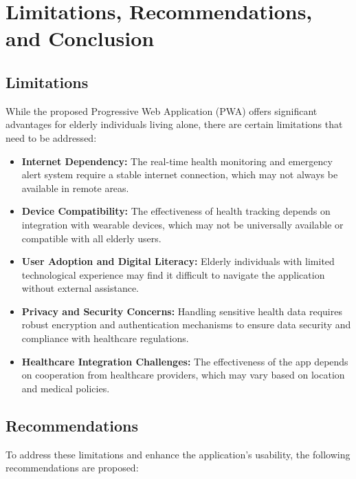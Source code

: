 \chapter{Limitations, Recommendations, and Conclusion}

\section{Limitations}
While the proposed Progressive Web Application (PWA) offers significant advantages for elderly individuals living alone, there are certain limitations that need to be addressed:

\begin{itemize}
    \item \textbf{Internet Dependency:} The real-time health monitoring and emergency alert system require a stable internet connection, which may not always be available in remote areas.
    \item \textbf{Device Compatibility:} The effectiveness of health tracking depends on integration with wearable devices, which may not be universally available or compatible with all elderly users.
    \item \textbf{User Adoption and Digital Literacy:} Elderly individuals with limited technological experience may find it difficult to navigate the application without external assistance.
    \item \textbf{Privacy and Security Concerns:} Handling sensitive health data requires robust encryption and authentication mechanisms to ensure data security and compliance with healthcare regulations.
    \item \textbf{Healthcare Integration Challenges:} The effectiveness of the app depends on cooperation from healthcare providers, which may vary based on location and medical policies.
\end{itemize}

\section{Recommendations}
To address these limitations and enhance the application's usability, the following recommendations are proposed:

